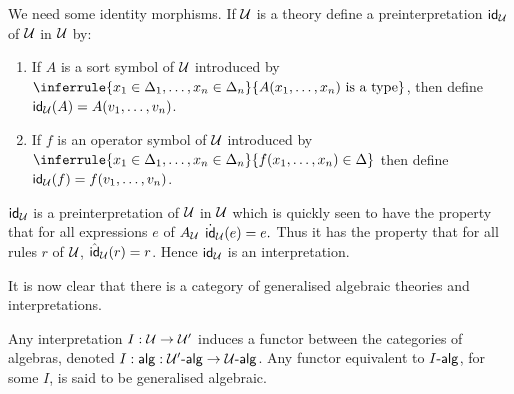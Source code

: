   We need some identity morphisms.
  If $\mathcal{U}$ is a theory define a preinterpretation $\mathsf{id}_{\mathcal{U}}$ of $\mathcal{U}$ in $\mathcal{U}$ by:
  \begin{enumerate}
    \item If $A$ is a sort symbol of $\mathcal{U}$ introduced by $\inferrule{x_1\in\Delta_1,\ldots,x_n\in\Delta_n}{A(x_1,\ldots,x_n)\isatype}$, then define $\mathsf{id}_{\mathcal{U}}(A)=A(v_1,\ldots,v_n)$.
    \item If $f$ is an operator symbol of $\mathcal{U}$ introduced by $\inferrule{x_1\in\Delta_1,\ldots,x_n\in\Delta_n}{f(x_1,\ldots,x_n)\in\Delta}$ then define $\mathsf{id}_{\mathcal{U}}(f)=f(v_1,\ldots,v_n)$.
  \end{enumerate}

  $\mathsf{id}_{\mathcal{U}}$ is a preinterpretation of $\mathcal{U}$ in $\mathcal{U}$ which is quickly seen to have the property that for all expressions $e$ of $A_{\mathcal{U}}$ $\dot {\mathsf{id}}_{\mathcal{U}}(e)=e.$
  Thus it has the property that for all rules $r$ of $\mathcal{U}$, $\hat{\mathsf{id}}_{\mathcal{U}}(r)=r$.
  Hence $\mathsf{id}_{\mathcal{U}}$ is an interpretation.

  It is now clear that there is a category of generalised algebraic theories and interpretations.

  Any interpretation $I:\mathcal{U}\to\mathcal{U}'$ induces a functor between the categories of algebras, denoted $I:\mathsf{alg}: \mathcal{U}'\text{-}\mathsf{alg}\to\mathcal{U}\text{-}\mathsf{alg}$.
  Any functor equivalent to $I\text{-}\mathsf{alg}$, for some $I$, is said to be generalised algebraic.

